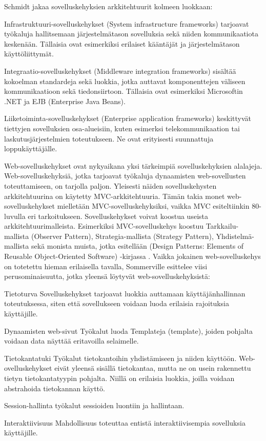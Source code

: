 \documentclass[utf8]{gradu3}
\begin{document}
Schmidt \parencite{frameworks} jakaa sovelluskehyksien arkkitehtuurit kolmeen luokkaan:

\begin{desclist}
\item[Infrastruktuuri-sovelluskehykset (System infrastructure frameworks)] tarjoavat työkaluja hallitsemaan järjestelmätason sovelluksia sekä niiden kommunikaatiota keskenään. Tällaisia ovat esimerkiksi erilaiset kääntäjät ja järjestelmätason käyttöliittymät. 
\item[Integraatio-sovelluskehykset (Middleware integration frameworks)] sisältää kokoelman standardeja sekä luokkia, jotka auttavat komponenttejen väliseen kommunikaatioon sekä tiedonsiirtoon. Tällaisia ovat esimerkiksi Microsoftin .NET ja EJB (Enterprise Java Beans). 
\item[Liiketoiminta-sovelluskehykset (Enterprise application frameworks)] keskittyvät tiettyjen sovelluksien osa-alueisiin, kuten esimerksi telekommunikaation tai laskutusjärjestelmien toteutukseen. Ne ovat erityisesti suunnattuja loppukäyttäjälle.
\end{desclist}

Web-sovelluskehykset ovat nykyaikana yksi tärkeimpiä sovelluskehyksien alalajeja. Web-sovelluskehyksiä, jotka tarjoavat työkaluja dynaamisten web-sovellusten toteuttamiseen, on tarjolla paljon. Yleisesti näiden sovelluskehysten arkkitehtuurina on käytetty MVC-arkkitehtuuria. Tämän takia monet web-sovelluskehykset mielletään MVC-sovelluskehyksiksi, vaikka MVC esiteltiinkin 80-luvulla eri tarkoitukseen. Sovelluskehykset voivat koostua useista arkkitehtuurimalleista. Esimerkiksi MVC-sovelluskehys koostuu Tarkkailu-mallista (Observer Pattern), Strategia-mallista (Strategy Pattern), Yhdistelmä-mallista sekä monista muista, jotka esitellään (Design Patterns: Elements of Reusable Object-Oriented Software) -kirjassa \parencite{design_patterns}. Vaikka jokainen web-sovelluskehys on totetettu hieman erilaisella tavalla, Sommerville esittelee viisi perusominaisuutta, jotka yleensä löytyvät web-sovelluskehyksistä:

\begin{desclist}
\item[Tietoturva] Sovelluskehykset tarjoavat luokkia auttamaan käyttäjänhallinnan toteutuksessa, siten että sovellukseen voidaan luoda erilaisia rajoituksia käyttäjille. 
\item[Dynaamisten web-sivut] Työkalut luoda Templateja (template), joiden pohjalta voidaan data näyttää eritavoilla selaimelle.
\item[Tietokantatuki] Työkalut tietokantoihin yhdistämiseen ja niiden käyttöön. Web-ovelluskehykset eivät yleensä sisällä tietokantaa, mutta ne on usein rakennettu tietyn tietokantatyypin pohjalta. Niillä on erilaisia luokkia, joilla voidaan abstrahoida tietokannan käyttö.
\item[Session-hallinta] työkalut sessioiden luontiin ja hallintaan.
\item[Interaktiivisuus] Mahdollisuus toteuttaa entistä interaktiivisempia sovelluksia käyttäjille. 
\end{desclist}
\end{document}
